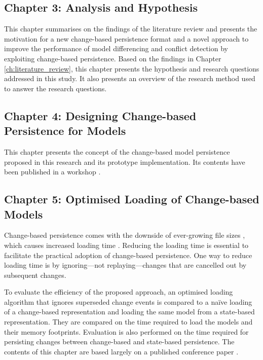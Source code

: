 \subsection{Chapter 3: Analysis and Hypothesis}
\label{sec:ch:analysis_and_hypothesis}
This chapter summarises on the findings of the literature review and presents the motivation for a new change-based persistence format and a novel approach to improve the performance of model differencing and conflict detection by exploiting change-based persistence. Based on the findings in Chapter \ref{ch:literature_review}, this chapter presents the hypothesis and research questions addressed in this study. It also presents an overview of the research method used to answer the research questions.

\subsection{Chapter 4: Designing Change-based Persistence for Models}
\label{sec:chapter_3_Change-based_model_ersistence_plan}
This chapter presents the concept of the change-based model persistence proposed in this research and its prototype implementation. Its contents have been published in a workshop \cite{DBLP:conf/models/YohannisKP17}.

\subsection{Chapter 5: Optimised Loading of Change-based Models}
\label{sec:chapter_4_optimised_loading_change_based_model_persistence}

Change-based persistence comes with the downside of ever-growing file sizes \cite{DBLP:journals/entcs/RobbesL07,DBLP:conf/edoc/KoegelHLHD10}, which causes increased loading time \cite{mens2002state}. Reducing the loading time is essential to facilitate the practical adoption of change-based persistence. One way to reduce loading time is by ignoring—not replaying—changes that are cancelled out by subsequent changes.

To evaluate the efficiency of the proposed approach, an optimised loading algorithm that ignores superseded change events is compared to a naïve loading of a change-based representation and loading the same model from a state-based representation. They are compared on the time required to load the models and their memory footprints. Evaluation is also performed on the time required for persisting changes between change-based and state-based persistence. The contents of this chapter are based largely on a published conference paper \cite{yohannis2018towards}.

